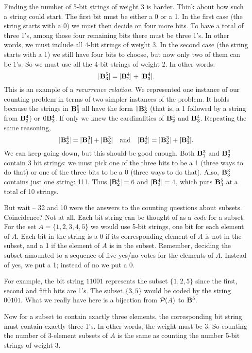 \documentclass[12pt]{article}
\begin{document}
Finding the number of 5-bit strings of weight 3 is harder.  Think about how such a string could start.  The first bit must be either a 0 or a 1.  In the first case (the string starts with a 0) we must then decide on four more bits.  To have a total of three 1's, among those four remaining bits there must be three 1's.  In other words, we must include all 4-bit strings of weight 3.  In the second case (the string starts with a 1) we still have four bits to choose, but now only two of them can be 1's.  So we must use all the 4-bit strings of weight 2.  In other words:
\[|\mathbf{B}^5_3| = |\mathbf{B}^4_2| + |\mathbf{B}^4_3|.\]
This is an example of a {\em recurrence relation}.  We represented one instance of our counting problem in terms of two simpler instances of the problem.  It holds because the strings in $\mathbf{B}^5_3$ all have the form $1\mathbf{B}^4_2$ (that is, a 1 followed by a string from $\mathbf{B}^4_2$) or $0\mathbf{B}^4_3$.  If only we knew the cardinalities of $\mathbf{B}^4_2$ and $\mathbf{B}^4_3$.  Repeating the same reasoning,
\[|\mathbf{B}^4_2| = |\mathbf{B}^3_1| + |\mathbf{B}^3_2| \quad \mbox{and}\quad |\mathbf{B}^4_3| = |\mathbf{B}^3_2| + |\mathbf{B}^3_3|.\]
We can keep going down, but this should be good enough. Both $\mathbf{B}^3_1$ and $\mathbf{B}^3_2$ contain 3 bit strings: we must pick one of the three bits to be a 1 (three ways to do that) or one of the three bits to be a 0 (three ways to do that).  Also, $\mathbf{B}^3_3$ contains just one string: 111.  Thus $|\mathbf{B}^4_2| = 6$ and $|\mathbf{B}^4_3| = 4$, which puts $\mathbf{B}^5_3$ at a total of 10 strings.

But wait -- 32 and 10 were the answers to the counting questions about subsets.  Coincidence?  Not at all.  Each bit string can be thought of as a {\em code} for a subset.  For the set $A = \{1,2,3,4,5\}$ we would use 5-bit strings, one bit for each element of $A$.  Each bit in the string is a 0 if its corresponding element of $A$ is not in the subset, and a 1 if the element of $A$ is in the subset.  Remember, deciding the subset amounted to a sequence of five yes/no votes for the elements of $A$.  Instead of yes, we put a 1; instead of no we put a 0.  

For example, the bit string $11001$ represents the subset $\{1,2,5\}$ since the first, second and fifth bits are 1's.  The subset $\{3,5\}$ would be coded by the string $00101$.  What we really have here is a bijection from $\mathcal P(A)$ to $\mathbf{B}^5$.

Now for a subset to contain exactly three elements, the corresponding bit string must contain exactly three 1's.  In other words, the weight must be 3.  So counting the number of 3-element subsets of $A$ is the same as counting the number 5-bit strings of weight 3.
\end{document}
